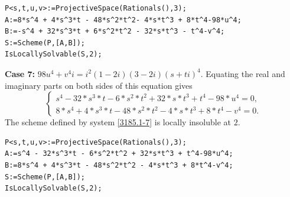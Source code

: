 \documentclass[a4paper,12pt,english,reqno]{amsart}
\begin{document}

\begin{lstlisting}
P<s,t,u,v>:=ProjectiveSpace(Rationals(),3);
A:=8*s^4 + 4*s^3*t - 48*s^2*t^2- 4*s*t^3 + 8*t^4-98*u^4;
B:=-s^4 + 32*s^3*t + 6*s^2*t^2 - 32*s*t^3 - t^4-v^4;
S:=Scheme(P,[A,B]);
IsLocallySolvable(S,2);
\end{lstlisting}

{\bf Case 7:} $98u^4+v^4i=i^2(1-2i)(3-2i)(s+ti)^4$.  Equating the real and imaginary parts on both sides of this equation gives
\begin{equation}\label{3185.2-7}
\begin{cases}
s^4 - 32*s^3*t - 6*s^2*t^2 + 32*s*t^3 + t^4 - 98*u^4=0,\\
8*s^4 + 4*s^3*t - 48*s^2*t^2 - 4*s*t^3 + 8*t^4 - v^4=0.
\end{cases}
\end{equation}
The scheme defined by system \eqref{3185.1-7} is locally insoluble at $2$.
%

\begin{lstlisting}
P<s,t,u,v>:=ProjectiveSpace(Rationals(),3);
A:=s^4 - 32*s^3*t - 6*s^2*t^2 + 32*s*t^3 + t^4-98*u^4;
B:=8*s^4 + 4*s^3*t - 48*s^2*t^2 - 4*s*t^3 + 8*t^4-v^4;
S:=Scheme(P,[A,B]);
IsLocallySolvable(S,2);
\end{lstlisting}
\end{document}
